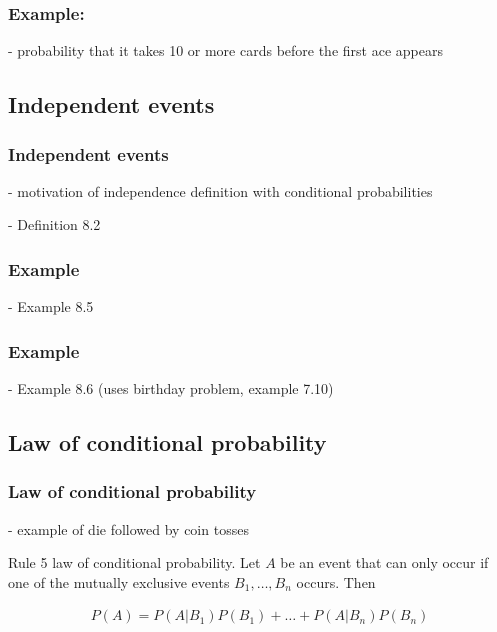 \begin{frame}
    \frametitle{Example:}

    - probability that it takes 10 or more cards before the first ace appears

\end{frame}

\subsection{Independent events}

\begin{frame}
    \frametitle{Independent events}

- motivation of independence definition with conditional probabilities

- Definition 8.2

\end{frame}

\begin{frame}
    \frametitle{Example}

- Example 8.5

\end{frame}

\begin{frame}
    \frametitle{Example}

- Example 8.6 (uses birthday problem, example 7.10)

\end{frame}

\subsection{Law of conditional probability}

\begin{frame}
    \frametitle{Law of conditional probability}

- example of die followed by coin tosses

    \begin{description}

        \item{Rule 5} law of conditional probability. Let $A$ be an event that
            can only occur if one of the mutually exclusive events
            $B_1,\ldots,B_n$ occurs. Then

            \begin{align*}
                P(A) = P(A|B_1) P(B_1) + \ldots + P(A|B_n) P(B_n)  
            \end{align*}

    \end{description}

\end{frame}


